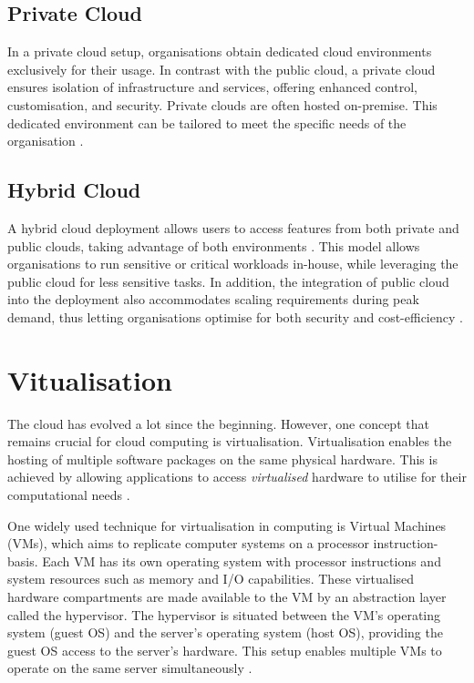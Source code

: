 \subsection{Private Cloud}

In a private cloud setup, organisations obtain dedicated cloud environments exclusively for their usage. In contrast with the public cloud, a private cloud ensures isolation of infrastructure and services, offering enhanced control, customisation, and security. Private clouds are often hosted on-premise. This dedicated environment can be tailored to meet the specific needs of the organisation \cite{ramgovind2010management}.

\subsection{Hybrid Cloud}

A hybrid cloud deployment allows users to access features from both private and public clouds, taking advantage of both environments \cite{ramgovind2010management, dash2016governance}. This model allows organisations to run sensitive or critical workloads in-house, while leveraging the public cloud for less sensitive tasks. In addition, the integration of public cloud into the deployment also accommodates scaling requirements during peak demand, thus letting organisations optimise for both security and cost-efficiency \cite{huangAchievingBigData2014}.




\section{Vitualisation}

The cloud has evolved a lot since the beginning. However, one concept that remains crucial for cloud computing is virtualisation. Virtualisation enables the hosting of multiple software packages on the same physical hardware. This is achieved by allowing applications to access \textit{virtualised} hardware to utilise for their computational needs \cite{goldbergSurveyVirtualMachine1974}.

One widely used technique for virtualisation in computing is Virtual Machines (VMs), which aims to replicate computer systems on a processor instruction-basis. Each VM has its own operating system with processor instructions and system resources such as memory and I/O capabilities. These virtualised hardware compartments are made available to the VM by an abstraction layer called the hypervisor. The hypervisor is situated between the VM's operating system (guest OS) and the server's operating system (host OS), providing the guest OS access to the server's hardware. This setup enables multiple VMs to operate on the same server simultaneously \cite{goldbergSurveyVirtualMachine1974}.

